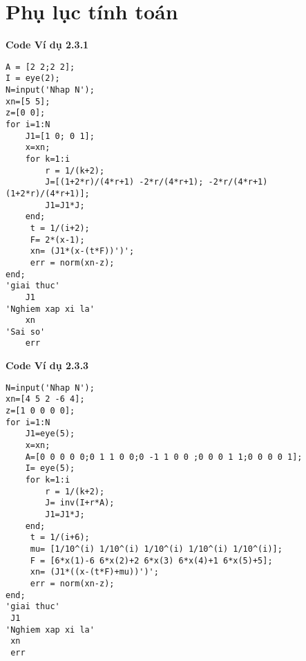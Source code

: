 \documentclass[14pt, oneside,A4paper]{book}
\theoremstyle{plain}
\begin{document}
\chapter*{Phụ lục tính toán}
\textbf{Code Ví dụ 2.3.1}
	\begin{lstlisting}
A = [2 2;2 2];
I = eye(2);
N=input('Nhap N');
xn=[5 5];
z=[0 0];
for i=1:N
    J1=[1 0; 0 1]; 
    x=xn;
    for k=1:i
        r = 1/(k+2);
        J=[(1+2*r)/(4*r+1) -2*r/(4*r+1); -2*r/(4*r+1) (1+2*r)/(4*r+1)];
        J1=J1*J;
    end;
     t = 1/(i+2);
     F= 2*(x-1);
     xn= (J1*(x-(t*F))')';
     err = norm(xn-z);
end;
'giai thuc'
    J1
'Nghiem xap xi la'
    xn
'Sai so'
    err
\end{lstlisting}
\newpage
\textbf{Code Ví dụ 2.3.3}
	\begin{lstlisting}
N=input('Nhap N');
xn=[4 5 2 -6 4];
z=[1 0 0 0 0];
for i=1:N
    J1=eye(5); 
    x=xn;
    A=[0 0 0 0 0;0 1 1 0 0;0 -1 1 0 0 ;0 0 0 1 1;0 0 0 0 1];
    I= eye(5);
    for k=1:i
        r = 1/(k+2);
        J= inv(I+r*A);
        J1=J1*J;
    end;
     t = 1/(i+6);
     mu= [1/10^(i) 1/10^(i) 1/10^(i) 1/10^(i) 1/10^(i)];    
     F = [6*x(1)-6 6*x(2)+2 6*x(3) 6*x(4)+1 6*x(5)+5];
     xn= (J1*((x-(t*F)+mu))')';
     err = norm(xn-z);
end;
'giai thuc'
 J1
'Nghiem xap xi la'
 xn
 err
\end{lstlisting}
\end{document}
